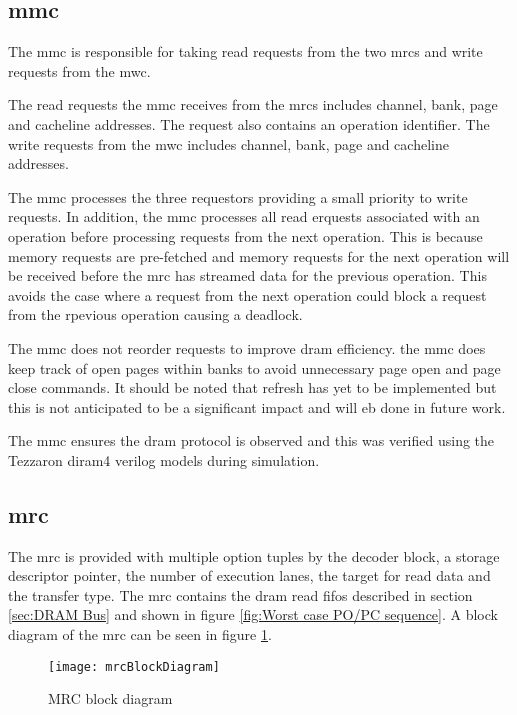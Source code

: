 \subsection{\Acf{mmc}}
\label{sec:MMC}

The \ac{mmc} is responsible for taking read requests from the two \acp{mrc} and write requests from the \ac{mwc}.

The read requests the \ac{mmc} receives from the \acp{mrc} includes channel, bank, page and cacheline addresses. 
The request also contains an operation identifier.
The write requests from the \ac{mwc} includes channel, bank, page and cacheline addresses. 

The \ac{mmc} processes the three requestors providing a small priority to write requests.
In addition, the \ac{mmc} processes all read erquests associated with an operation before processing requests from the next operation.
This is because memory requests are pre-fetched and memory requests for the next operation will be received before the \ac{mrc} has streamed data for the previous operation.
This avoids the case where a request from the next operation could block a request from the rpevious operation causing a deadlock.

The \ac{mmc} does not reorder requests to improve \ac{dram} efficiency. 
the \ac{mmc} does keep track of open pages within banks to avoid unnecessary page open and page close commands.
It should be noted that refresh has yet to be implemented but this is not anticipated to be a significant impact and will eb done in future work.

The \ac{mmc} ensures the \ac{dram} protocol is observed and this was verified using the Tezzaron \ac{diram4} verilog models during simulation.


\subsection{\Acf{mrc}}
\label{sec:MRC}

The \ac{mrc} is provided with multiple option tuples by the decoder block, a storage descriptor pointer, the number of execution lanes, the target for read data and the transfer type.
The \ac{mrc} contains the \ac{dram} read \acp{fifo} described in section \ref{sec:DRAM Bus} and shown in figure \ref{fig:Worst case PO/PC sequence}.
A block diagram of the \ac{mrc} can be seen in figure \ref{fig:MRC block diagram}.
\begin{figure}[h]
\centering
\captionsetup{justification=centering}
\captionsetup{width=.9\linewidth}
\centerline{
\mbox{\texttt{[image: mrcBlockDiagram]}}
}
\center\caption{MRC block diagram}
\label{fig:MRC block diagram}
\end{figure}

